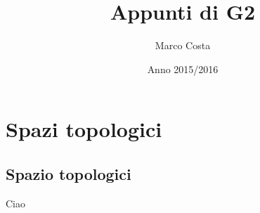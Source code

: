 \documentclass[a4paper,12pt]{amsbook}
\title{Appunti di G2}
\author{Marco Costa}
\date{Anno 2015/2016}
\begin{document}
\maketitle
\tableofcontents
\chapter{Spazi topologici}

\section{Spazio topologici}

Ciao
\end{document}
